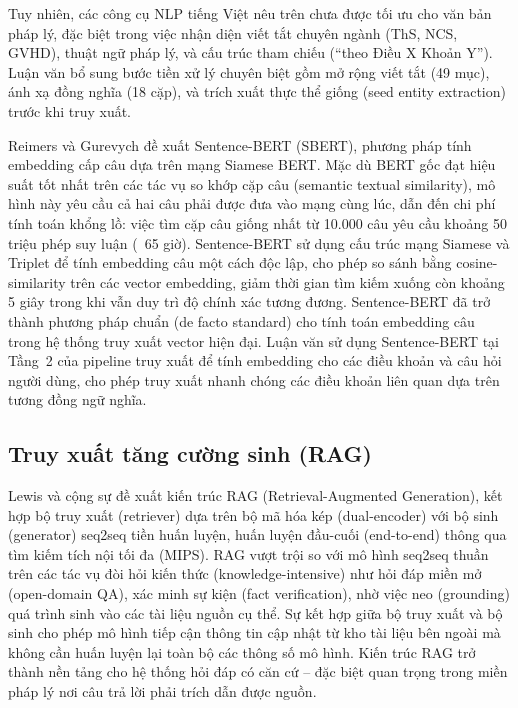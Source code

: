 Tuy nhiên, các công cụ NLP tiếng Việt nêu trên chưa được tối ưu cho văn bản pháp
lý, đặc biệt trong việc nhận diện viết tắt chuyên ngành (ThS, NCS, GVHD), thuật
ngữ pháp lý, và cấu trúc tham chiếu (``theo Điều X Khoản Y''). Luận văn bổ sung
bước tiền xử lý chuyên biệt gồm mở rộng viết tắt (49 mục), ánh xạ đồng nghĩa
(18 cặp), và trích xuất thực thể giống (seed entity extraction) trước khi truy xuất.

Reimers và Gurevych \cite{reimers2019sbert} đề xuất Sentence-BERT (SBERT), phương
pháp tính embedding cấp câu dựa trên mạng Siamese BERT. Mặc dù BERT gốc đạt hiệu
suất tốt nhất trên các tác vụ so khớp cặp câu (semantic textual similarity), mô
hình này yêu cầu cả hai câu phải được đưa vào mạng cùng lúc, dẫn đến chi phí tính
toán khổng lồ: việc tìm cặp câu giống nhất từ 10.000 câu yêu cầu khoảng 50 triệu
phép suy luận (~65 giờ). Sentence-BERT sử dụng cấu trúc mạng Siamese và Triplet để
tính embedding câu một cách độc lập, cho phép so sánh bằng cosine-similarity trên
các vector embedding, giảm thời gian tìm kiếm xuống còn khoảng 5 giây trong khi vẫn
duy trì độ chính xác tương đương. Sentence-BERT đã trở thành phương pháp chuẩn (de
facto standard) cho tính toán embedding câu trong hệ thống truy xuất vector hiện đại.
Luận văn sử dụng Sentence-BERT tại Tầng~2 của pipeline truy xuất để tính embedding
cho các điều khoản và câu hỏi người dùng, cho phép truy xuất nhanh chóng các điều
khoản liên quan dựa trên tương đồng ngữ nghĩa.

\subsection{Truy xuất tăng cường sinh (RAG)}
\label{subsec:rag}

Lewis và cộng sự \cite{lewis2020rag} đề xuất kiến trúc RAG (Retrieval-Augmented
Generation), kết hợp bộ truy xuất (retriever) dựa trên bộ mã hóa kép (dual-encoder)
với bộ sinh (generator) seq2seq tiền huấn luyện, huấn luyện đầu-cuối
(end-to-end) thông qua tìm kiếm tích nội tối đa (MIPS). RAG vượt trội so với mô
hình seq2seq thuần trên các tác vụ đòi hỏi kiến thức (knowledge-intensive) như hỏi
đáp miền mở (open-domain QA), xác minh sự kiện (fact verification), nhờ việc neo
(grounding) quá trình sinh vào các tài liệu nguồn cụ thể. Sự kết hợp giữa bộ truy
xuất và bộ sinh cho phép mô hình tiếp cận thông tin cập nhật từ kho tài liệu bên
ngoài mà không cần huấn luyện lại toàn bộ các thông số mô hình. Kiến trúc RAG trở
thành nền tảng cho hệ thống hỏi đáp có căn cứ -- đặc biệt quan trọng trong miền
pháp lý nơi câu trả lời phải trích dẫn được nguồn.

